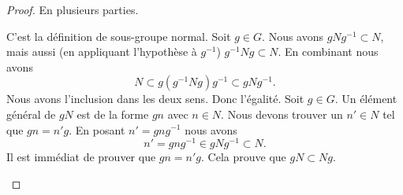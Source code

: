 \begin{proof}
	En plusieurs parties.
	\begin{subproof}
		C'est la définition de sous-groupe normal.
		Soit \( g\in G\). Nous avons \( gNg^{-1}\subset N\), mais aussi (en appliquant l'hypothèse à \( g^{-1}\)) \( g^{-1}Ng\subset N\). En combinant nous avons
		\begin{equation}
			N\subset g(g^{-1} Ng)g^{-1}\subset g Ng^{-1}.
		\end{equation}
		Nous avons l'inclusion dans les deux sens. Donc l'égalité.
		Soit \( g\in G\). Un élément général de \( gN\) est de la forme \( gn\) avec \( n\in N\). Nous devons trouver un \( n'\in N\) tel que \( gn=n'g\). En posant \( n'=gng^{-1}\) nous avons
		\begin{equation}
			n'=gng^{-1}\in gNg^{-1}\subset N.
		\end{equation}
		Il est immédiat de prouver que \( gn=n'g\). Cela prouve que \( gN\subset Ng\).


\end{subproof}
\end{proof}

